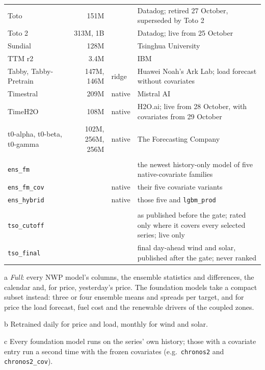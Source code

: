 \documentclass[11pt,a4paper]{article}
\newcommand{\m}[1]{\texttt{#1}}
\begin{document}
\begin{table}[!tp]
\begin{threeparttable}
\begin{tabularx}{\linewidth}{@{}l r l Y@{}}
Toto & 151M &  & Datadog; retired 27 October, superseded by Toto 2 \\
Toto 2 & 313M, 1B & & Datadog; live from 25 October \\
Sundial & 128M & & Tsinghua University \\
TTM r2 & 3.4M & & IBM \\
Tabby, Tabby-Pretrain & 147M, 146M & ridge & Huawei Noah's Ark Lab; load forecast without covariates \\
Timestral & 209M & native & Mistral AI \\
TimeH2O & 108M & native & H2O.ai; live from 28 October, with covariates from 29 October \\
t0-alpha, t0-beta, t0-gamma & 102M, 256M, 256M & native & The Forecasting Company \\
\addlinespace
{} \\
\m{ens\_fm} & & & the newest history-only model of five native-covariate families \\
\m{ens\_fm\_cov} & & native & their five covariate variants \\
\m{ens\_hybrid} & & native & those five and \m{lgbm\_prod} \\
\addlinespace
{} \\
\m{tso\_cutoff} & & & as published before the gate; rated only where it covers every selected series; live only \\
\m{tso\_final} & & & final day-ahead wind and solar, published after the gate; never ranked \\
\bottomrule
\end{tabularx}
\begin{tablenotes}\footnotesize
\item[a] \emph{Full}: every NWP model's columns, the ensemble statistics and differences, the calendar and, for price,
yesterday's price. The foundation models take a compact subset instead: three or four ensemble means and spreads per
target, and for price the load forecast, fuel cost and the renewable drivers of the coupled zones.
\item[b] Retrained daily for price and load, monthly for wind and solar.
\item[c] Every foundation model runs on the series' own history; those with a covariate entry run a second time with
the frozen covariates (e.g.\ \m{chronos2} and \m{chronos2\_cov}).

\end{tablenotes}
\end{threeparttable}
\end{table}
\end{document}
